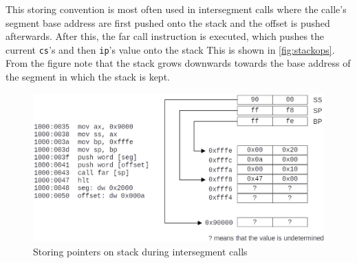 This storing convention is most often used in intersegment calls where the calle's segment base address are first pushed onto the stack and the offset is pushed afterwards. After this, the far call instruction is executed, which pushes the current \verb|cs|'s and then \verb|ip|'s value onto the stack This is shown in \autoref{fig:stackops}. From the figure note that the stack grows downwards towards the base address of the segment in which the stack is kept.
\begin{figure}[h]
  \centering
  \includegraphics[scale=0.25]{figures/stackop.eps}
  \caption{Storing pointers on stack during intersegment calls}
\label{fig:stackops}
\end{figure}


